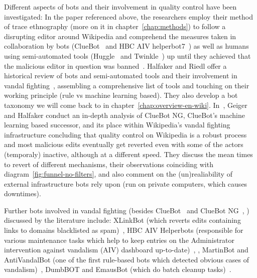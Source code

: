 Different aspects of bots and their involvement in quality control have been investigated:
In the paper referenced above, the researchers employ their method of trace ethnography (more on it in chapter~\ref{chap:methods}) to follow a disrupting editor around Wikipedia and comprehend the measures taken in collaboration by bots (ClueBot~\cite{Wikipedia:ClueBot} and HBC AIV helperbot7~\cite{Wikipedia:HBCAIVHelperbot}) as well as humans using semi-automated tools (Huggle~\cite{Wikipedia:Huggle} and Twinkle~\cite{Wikipedia:Twinkle}) up until they achieved that the malicious editor in question was banned~\cite{GeiRib2010}.
Halfaker and Riedl offer a historical review of bots and semi-automated tools and their involvement in vandal fighting~\cite{HalRied2012}, assembling a comprehensive list of tools and touching on their working principle (rule vs machine learning based).
They also develop a bot taxonomy we will come back to in chapter~\ref{chap:overview-en-wiki}. %
In~\cite{GeiHal2013}, Geiger and Halfaker conduct an in-depth analysis of ClueBot NG, ClueBot's machine learning based successor, and its place within Wikipedia's vandal fighting infrastructure concluding that quality control on Wikipedia is a robust process and most malicious edits eventually get reverted even with some of the actors (temporaly) inactive, although at a different speed.
They discuss the mean times to revert of different mechanisms, their observations coinciding with diagram~\ref{fig:funnel-no-filters},
and also comment on the (un)realiability of external infrastructure bots rely upon (run on private computers, which causes downtimes).

Further bots involved in vandal fighting (besides ClueBot~\cite{GeiRib2010} and ClueBot NG~\cite{GeiHal2013}, \cite{HalRied2012}) discussed by the literature include:
XLinkBot (which reverts edits containing links to domains blacklisted as spam)~\cite{HalRied2012},
HBC AIV Helperbots (responsible for various maintenance tasks which help to keep entries on the Administrator intervention against vandalism (AIV) dashboard up-to-date)~\cite{HalRied2012}, \cite{GeiRib2010},
MartinBot and AntiVandalBot (one of the first rule-based bots which detected obvious cases of vandalism)~\cite{HalRied2012},
DumbBOT and EmausBot (which do batch cleanup tasks)~\cite{GeiHal2013}.

